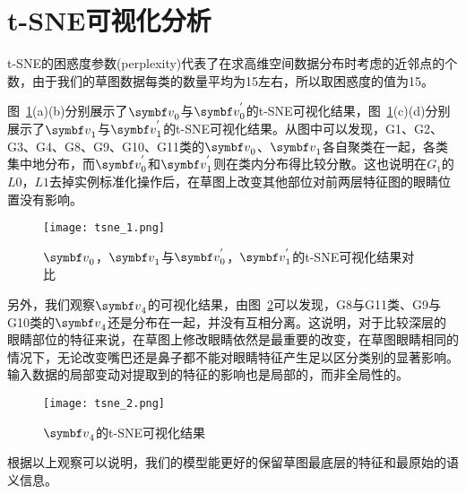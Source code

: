 \section{t-SNE可视化分析}

t-SNE的困惑度参数(perplexity)代表了在求高维空间数据分布时考虑的近邻点的个数，由于我们的草图数据每类的数量平均为15左右，所以取困惑度的值为15。

图~\ref{fig:tsne_1}(a)(b)分别展示了$\vv_0$与$\vv_0^{'}$的t-SNE可视化结果，图~\ref{fig:tsne_1}(c)(d)分别展示了$\vv_1$与$\vv_1^{'}$的t-SNE可视化结果。从图中可以发现，G1、G2、G3、G4、G8、G9、G10、G11类的$\vv_0$、$\vv_1$各自聚类在一起，各类集中地分布，而$\vv_0^{'}$和$\vv_1^{'}$则在类内分布得比较分散。这也说明在$G_1$的$L0$，$L1$去掉实例标准化操作后，在草图上改变其他部位对前两层特征图的眼睛位置没有影响。
\begin{figure}[htb]
	\centering
	\texttt{[image: tsne\_1.png]}
	\caption{$\vv_0$，$\vv_1$与$\vv_0^{'}$，$\vv_1^{'}$的t-SNE可视化结果对比}
	\label{fig:tsne_1}
\end{figure}

另外，我们观察$\vv_4$的可视化结果，由图~\ref{fig:tsne_2}可以发现，G8与G11类、G9与G10类的$\vv_4$还是分布在一起，并没有互相分离。这说明，对于比较深层的眼睛部位的特征来说，在草图上修改眼睛依然是最重要的改变，在草图眼睛相同的情况下，无论改变嘴巴还是鼻子都不能对眼睛特征产生足以区分类别的显著影响。输入数据的局部变动对提取到的特征的影响也是局部的，而非全局性的。
\begin{figure}[htb]
	\centering
	\texttt{[image: tsne\_2.png]}
	\caption{$\vv_4$的t-SNE可视化结果}
	\label{fig:tsne_2}
\end{figure}


根据以上观察可以说明，我们的模型能更好的保留草图最底层的特征和最原始的语义信息。



